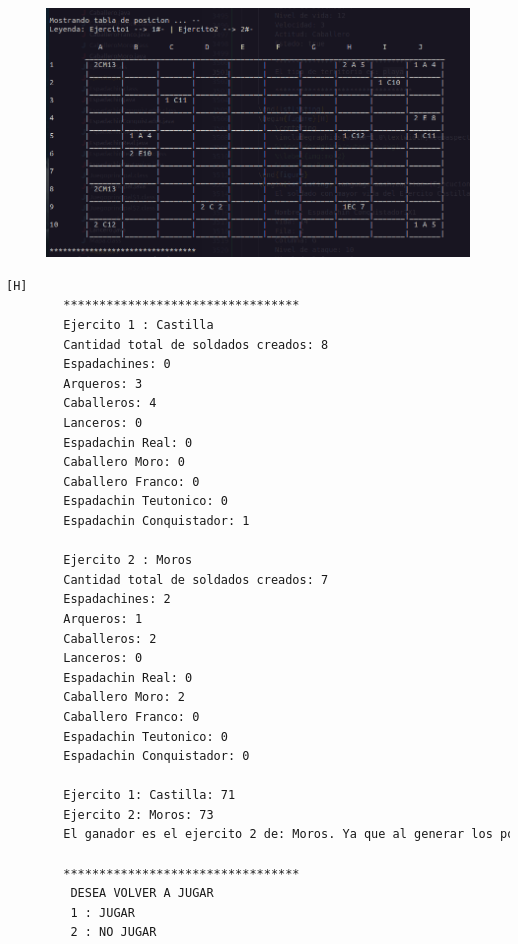 \documentclass{article}
\begin{document}
	\begin{figure}[H]
		\centering
		\includegraphics[width=1.0\textwidth,keepaspectratio]{img/Commit11-3.png}
	\end{figure}
	\begin{lstlisting}[language=bash,caption={Ejecucion:}][H]
		*********************************
		Ejercito 1 : Castilla
		Cantidad total de soldados creados: 8
		Espadachines: 0
		Arqueros: 3
		Caballeros: 4
		Lanceros: 0
		Espadachin Real: 0
		Caballero Moro: 0
		Caballero Franco: 0
		Espadachin Teutonico: 0
		Espadachin Conquistador: 1
		
		Ejercito 2 : Moros
		Cantidad total de soldados creados: 7
		Espadachines: 2
		Arqueros: 1
		Caballeros: 2
		Lanceros: 0
		Espadachin Real: 0
		Caballero Moro: 2
		Caballero Franco: 0
		Espadachin Teutonico: 0
		Espadachin Conquistador: 0
		
		Ejercito 1: Castilla: 71
		Ejercito 2: Moros: 73
		El ganador es el ejercito 2 de: Moros. Ya que al generar los porcentajes de probabilidad de victoria basada en los niveles de vida de sus soldados y aplicando un experimento aleatorio salio vencedor. (Aleatorio generado : 50.69)
		
		*********************************
		 DESEA VOLVER A JUGAR
		 1 : JUGAR
		 2 : NO JUGAR
		
	\end{lstlisting}
\end{document}
